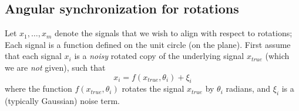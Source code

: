 \documentclass{pnastwo}
\begin{document}
\begin{article}







\begin{materials}

\section{Angular synchronization for rotations\cite{singer2011angular}}

Let $x_1, \dots, x_m$ denote the signals that we wish to align with respect to rotations;
%
Each signal is a function defined on the unit circle (on the plane).
%
%
First assume that each signal $x_i$ is a {\em noisy} rotated copy of the underlying signal $x_{true}$
(which we are {\em not} given), such that
\begin{equation}
x_i = f(x_{true}, \theta_i) + \xi_i
\end{equation}
where the function $f(x_{true}, \theta_i)$ rotates the signal $x_{true}$ by $\theta_i$ radians, and $\xi_i$ is a (typically Gaussian) noise term.
%


\end{materials}
\end{article}
\end{document}
